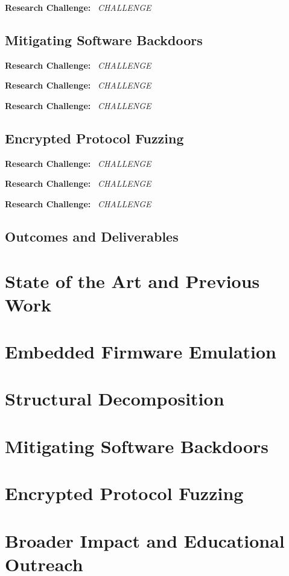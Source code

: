 \documentclass[letterpaper,twoside,11pt,headings=small]{scrartcl}
\renewcommand{\paragraph}[1]{{\sffamily\textbf{#1}}~}
\newcommand{\challenge}[1]{\paragraph{Research Challenge:} \emph{#1}}
\begin{document}
\challenge{CHALLENGE}

\subsection{Mitigating Software Backdoors}
\label{sec:overview:backdoors}

\challenge{CHALLENGE}

\challenge{CHALLENGE}

\challenge{CHALLENGE}

\subsection{Encrypted Protocol Fuzzing}
\label{sec:overview:fuzzing}

\challenge{CHALLENGE}

\challenge{CHALLENGE}

\challenge{CHALLENGE}

\subsection{Outcomes and Deliverables}
\label{sec:overview:outcomes}

\section{State of the Art and Previous Work}
\label{sec:related}

\section{Embedded Firmware Emulation}
\label{sec:research:firmware}

\section{Structural Decomposition}
\label{sec:research:structure}

\section{Mitigating Software Backdoors}
\label{sec:research:backdoors}

\section{Encrypted Protocol Fuzzing}
\label{sec:research:fuzzing}

\section{Broader Impact and Educational Outreach}
\label{sec:impact}
\end{document}
